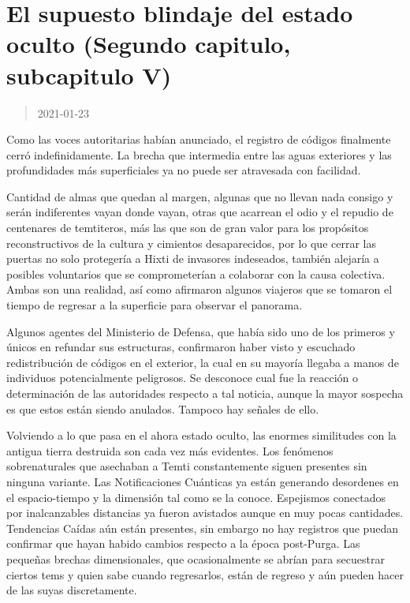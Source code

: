 \documentclass[
  spanish,
]{book}
\begin{document}
\hypertarget{el-supuesto-blindaje-del-estado-oculto-segundo-capitulo-subcapitulo-v}{%
\section{El supuesto blindaje del estado oculto (Segundo capitulo, subcapitulo V)}\label{el-supuesto-blindaje-del-estado-oculto-segundo-capitulo-subcapitulo-v}}

\begin{quote}
2021-01-23
\end{quote}

Como las voces autoritarias habían anunciado, el registro de códigos finalmente cerró indefinidamente. La brecha que intermedia entre las aguas exteriores y las profundidades más superficiales ya no puede ser atravesada con facilidad.

Cantidad de almas que quedan al margen, algunas que no llevan nada consigo y serán indiferentes vayan donde vayan, otras que acarrean el odio y el repudio de centenares de temtiteros, más las que son de gran valor para los propósitos reconstructivos de la cultura y cimientos desaparecidos, por lo que cerrar las puertas no solo protegería a Hixti de invasores indeseados, también alejaría a posibles voluntarios que se comprometerían a colaborar con la causa colectiva. Ambas son una realidad, así como afirmaron algunos viajeros que se tomaron el tiempo de regresar a la superficie para observar el panorama.

Algunos agentes del Ministerio de Defensa, que había sido uno de los primeros y únicos en refundar sus estructuras, confirmaron haber visto y escuchado redistribución de códigos en el exterior, la cual en su mayoría llegaba a manos de individuos potencialmente peligrosos. Se desconoce cual fue la reacción o determinación de las autoridades respecto a tal noticia, aunque la mayor sospecha es que estos están siendo anulados. Tampoco hay señales de ello.

Volviendo a lo que pasa en el ahora estado oculto, las enormes similitudes con la antigua tierra destruida son cada vez más evidentes. Los fenómenos sobrenaturales que asechaban a Temti constantemente siguen presentes sin ninguna variante. Las Notificaciones Cuánticas ya están generando desordenes en el espacio-tiempo y la dimensión tal como se la conoce. Espejismos conectados por inalcanzables distancias ya fueron avistados aunque en muy pocas cantidades. Tendencias Caídas aún están presentes, sin embargo no hay registros que puedan confirmar que hayan habido cambios respecto a la época post-Purga. Las pequeñas brechas dimensionales, que ocasionalmente se abrían para secuestrar ciertos tems y quien sabe cuando regresarlos, están de regreso y aún pueden hacer de las suyas discretamente.
\end{document}
